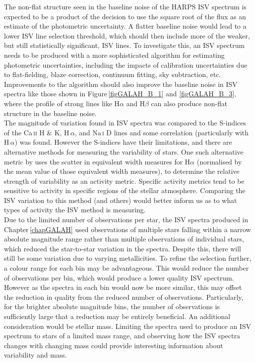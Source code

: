 The non-flat structure seen in the baseline noise of the HARPS ISV spectrum is expected to be a product of the decision to use the square root of the flux as an estimate of the photometric uncertainty. A flatter baseline noise would lead to a lower ISV line selection threshold, which should then include more of the weaker, but still statistically significant, ISV lines. To investigate this, an ISV spectrum needs to be produced with a more sophisticated algorithm for estimating photometric uncertainties, including the impacts of calibration uncertainties due to flat-fielding, blaze correction, continuum fitting, sky subtraction, etc. Improvements to the algorithm should also improve the baseline noise in ISV spectra like those shown in  Figure\,\ref{figGALAH_B_1} and \ref{figGALAH_B_3}, where the profile of strong lines like H$\alpha$ and H$\beta$ can also produce non-flat structure in the baseline noise.\\

The magnitude of variation found in ISV spectra was compared to the S-indices of the Ca\,\textsc{ii} H \& K, H\,\textsc{$\alpha$}, and Na\,\textsc{i} D lines and some correlation (particularly with H\,\textsc{$\alpha$}) was found. However the S-indices have their limitations, and there are alternative methods for measuring the variability of stars. One such alternative metric by \citealt{2012Bell} uses the scatter in equivalent width measures for H$\alpha$ (normalised by the mean value of those equivalent width measures), to determine the relative strength of variability as an activity metric. Specific activity metrics tend to be sensitive to activity in specific regions of the stellar atmosphere. Comparing the ISV variation to this method (and others) would better inform us as to what types of activity the ISV method is measuring.\\

Due to the limited number of observations per star, the ISV spectra produced in Chapter\,\ref{chapGALAH} used observations of multiple stars falling within a narrow absolute magnitude range rather than multiple observations of individual stars, which reduced the star-to-star variation in the spectra. Despite this, there will still be some variation due to varying metallicities. To refine the selection further, a colour range for each bin may be advantageous. This would reduce the number of observations per bin, which would produce a lower quality ISV spectrum. However as the spectra in each bin would now be more similar, this may offset the reduction in quality from the reduced number of observations. Particularly, for the brighter absolute magnitude bins, the number of observations is sufficiently large that a reduction may be entirely beneficial. An additional consideration would be stellar mass. Limiting the spectra used to produce an ISV spectrum to stars of a limited mass range, and observing how the ISV spectra changes with changing mass could provide interesting information about variability and mass.\\

